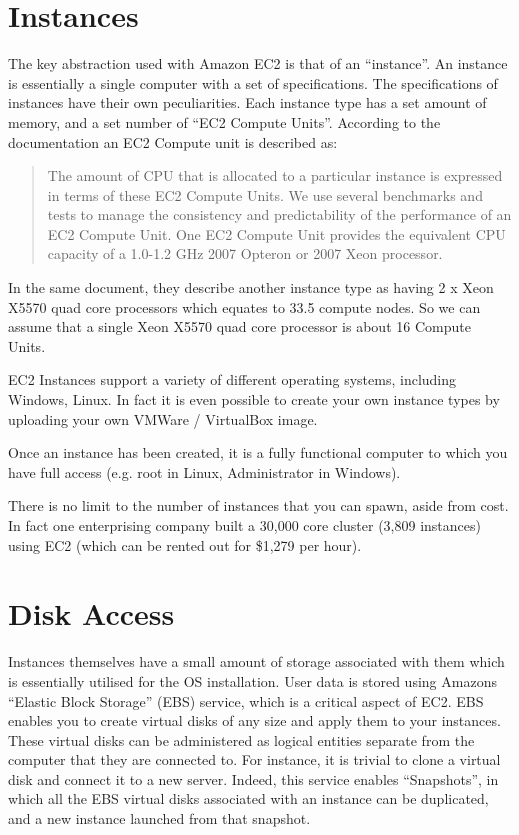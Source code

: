 \section{Instances}
The key abstraction used with Amazon EC2 is that of an ``instance''. An instance is essentially a single computer with a set of specifications. The specifications of instances have their own peculiarities. Each instance type has a set amount of memory, and a set number of ``EC2 Compute Units''. According to the documentation an EC2 Compute unit is described as:
\begin{quote}
The amount of CPU that is allocated to a particular instance is expressed in terms of these EC2 Compute Units. We use several benchmarks and tests to manage the consistency and predictability of the performance of an EC2 Compute Unit. One EC2 Compute Unit provides the equivalent CPU capacity of a 1.0-1.2 GHz 2007 Opteron or 2007 Xeon processor\ftAmThree.\ftAmThreeText
\end{quote}
In the same document, they describe another instance type as having 2 x Xeon X5570 quad core processors which equates to 33.5 compute nodes. So we can assume that a single Xeon X5570 quad core processor is about 16 Compute Units.

EC2 Instances support a variety of different operating systems, including Windows, Linux. In fact it is even possible to create your own instance types by uploading your own VMWare / VirtualBox image. 

Once an instance has been created, it is a fully functional computer to which you have full access (e.g. root in Linux, Administrator in Windows). 

There is no limit to the number of instances that you can spawn, aside from cost. In fact one enterprising company built a 30,000 core cluster (3,809 instances) using EC2 (which can be rented out for \$1,279 per hour)\ftAmFour.\ftAmFourText

\section{Disk Access}
Instances themselves have a small amount of storage associated with them which is essentially utilised for the OS installation. User data is stored using Amazons ``Elastic Block Storage'' (EBS) service, which is a critical aspect of EC2. EBS enables you to create virtual disks of any size and apply them to your instances. These virtual disks can be administered as logical entities separate from the computer that they are connected to. For instance, it is trivial to clone a virtual disk and connect it to a new server. Indeed, this service enables ``Snapshots'', in which all the EBS virtual disks associated with an instance can be duplicated, and a new instance launched from that snapshot.

